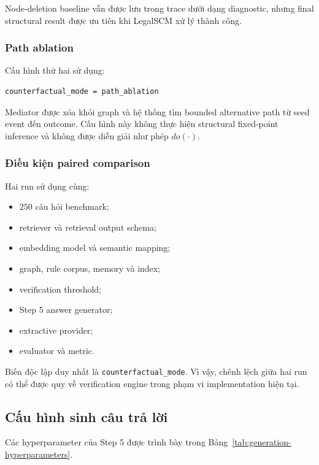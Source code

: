 Node-deletion baseline vẫn được lưu trong trace dưới dạng diagnostic, nhưng
final structural result được ưu tiên khi LegalSCM xử lý thành công.

\subsubsection{Path ablation}

Cấu hình thứ hai sử dụng:

\begin{verbatim}
counterfactual_mode = path_ablation
\end{verbatim}

Mediator được xóa khỏi graph và hệ thống tìm bounded alternative path từ
seed event đến outcome. Cấu hình này không thực hiện structural fixed-point
inference và không được diễn giải như phép \(do(\cdot)\).

\subsubsection{Điều kiện paired comparison}

Hai run sử dụng cùng:

\begin{itemize}
    \item \(250\) câu hỏi benchmark;
    \item retriever và retrieval output schema;
    \item embedding model và semantic mapping;
    \item graph, rule corpus, memory và index;
    \item verification threshold;
    \item Step 5 answer generator;
    \item extractive provider;
    \item evaluator và metric.
\end{itemize}

Biến độc lập duy nhất là \texttt{counterfactual\_mode}. Vì vậy, chênh lệch
giữa hai run có thể được quy về verification engine trong phạm vi
implementation hiện tại.

\subsection{Cấu hình sinh câu trả lời}

Các hyperparameter của Step 5 được trình bày trong
Bảng~\ref{tab:generation-hyperparameters}.

